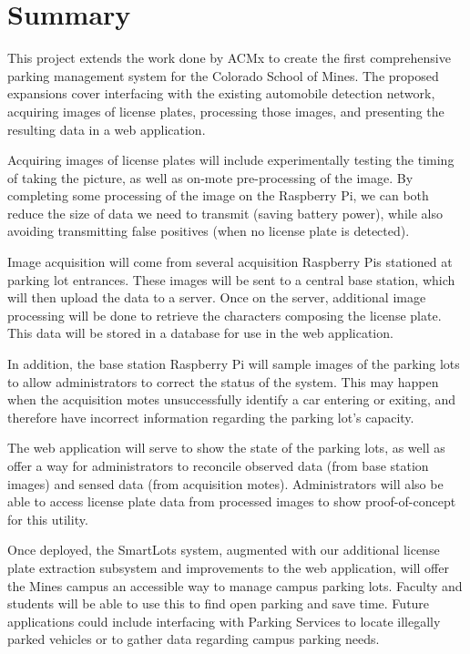 \documentclass[11pt, oneside, fullpage, doublespace]{article}
\begin{document}
\section{Summary}
This project extends the work done by ACMx to create the first comprehensive parking management system for the Colorado School of Mines. The proposed expansions cover interfacing with the existing automobile detection network, acquiring images of license plates, processing those images, and presenting the resulting data in a web application.

Acquiring images of license plates will include experimentally testing the timing of taking the picture, as well as on-mote pre-processing of the image. By completing some processing of the image on the Raspberry Pi, we can both reduce the size of data we need to transmit (saving battery power), while also avoiding transmitting false positives (when no license plate is detected).

Image acquisition will come from several acquisition Raspberry Pis stationed at parking lot entrances. These images will be sent to a central base station, which will then upload the data to a server. Once on the server, additional image processing will be done to retrieve the characters composing the license plate. This data will be stored in a database for use in the web application.

In addition, the base station Raspberry Pi will sample images of the parking lots to allow administrators to correct the status of the system. This may happen when the acquisition motes unsuccessfully identify a car entering or exiting, and therefore have incorrect information regarding the parking lot's capacity.

The web application will serve to show the state of the parking lots, as well as offer a way for administrators to reconcile observed data (from base station images) and sensed data (from acquisition motes). Administrators will also be able to access license plate data from processed images to show proof-of-concept for this utility.

Once deployed, the SmartLots system, augmented with our additional license plate extraction subsystem and improvements to the web application, will offer the Mines campus an accessible way to manage campus parking lots. Faculty and students will be able to use this to find open parking and save time. Future applications could include interfacing with Parking Services to locate illegally parked vehicles or to gather data regarding campus parking needs.
\end{document}
